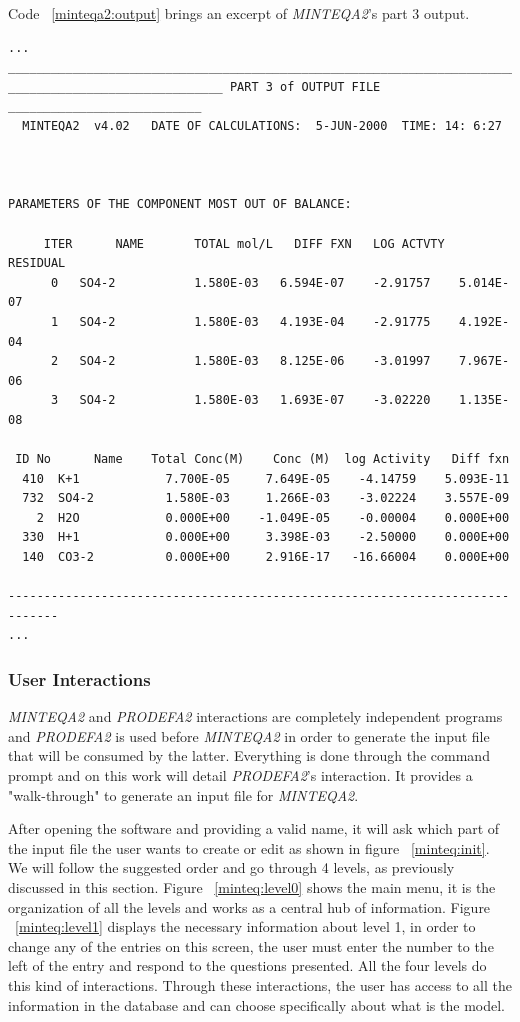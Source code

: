 \documentclass[ppgc,mestrado,english]{iiufrgs}
\begin{document}
Code ~\ref{minteqa2:output} brings an excerpt of \emph{MINTEQA2}'s part 3 output.

\begin{minipage}[c]{0.95\textwidth}
\begin{lstlisting}[frame=single, caption=\emph{MINTEQA2}'s excerpt from the output file, label=minteqa2:output]
...
________________________________________________________________________________
______________________________ PART 3 of OUTPUT FILE ___________________________
  MINTEQA2  v4.02   DATE OF CALCULATIONS:  5-JUN-2000  TIME: 14: 6:27



PARAMETERS OF THE COMPONENT MOST OUT OF BALANCE:

     ITER      NAME       TOTAL mol/L   DIFF FXN   LOG ACTVTY    RESIDUAL
      0   SO4-2           1.580E-03   6.594E-07    -2.91757    5.014E-07
      1   SO4-2           1.580E-03   4.193E-04    -2.91775    4.192E-04
      2   SO4-2           1.580E-03   8.125E-06    -3.01997    7.967E-06
      3   SO4-2           1.580E-03   1.693E-07    -3.02220    1.135E-08

 ID No      Name    Total Conc(M)    Conc (M)  log Activity   Diff fxn
  410  K+1            7.700E-05     7.649E-05    -4.14759    5.093E-11
  732  SO4-2          1.580E-03     1.266E-03    -3.02224    3.557E-09
    2  H2O            0.000E+00    -1.049E-05    -0.00004    0.000E+00
  330  H+1            0.000E+00     3.398E-03    -2.50000    0.000E+00
  140  CO3-2          0.000E+00     2.916E-17   -16.66004    0.000E+00

-----------------------------------------------------------------------------
...
\end{lstlisting}
\end{minipage}

\subsubsection{User Interactions}\label{minteq:interactions}
\emph{MINTEQA2} and \emph{PRODEFA2} interactions are completely independent programs and \emph{PRODEFA2} is used before \emph{MINTEQA2} in order to generate the input file that will be consumed by the latter. Everything is done through the command prompt and on this work will detail \emph{PRODEFA2}'s interaction. It provides a "walk-through" to generate an input file for \emph{MINTEQA2}.

After opening the software and providing a valid name, it will ask which part of the input file the user wants to create or edit as shown in figure ~\ref{minteq:init}. We will follow the suggested order and go through 4 levels, as previously discussed in this section. Figure ~\ref{minteq:level0} shows the main menu, it is the organization of all the levels and works as a central hub of information. Figure ~\ref{minteq:level1} displays the necessary information about level 1,     in order to change any of the entries on this screen, the user must enter the number to the left of the entry and respond to the questions presented. All the four levels do this kind of interactions. Through these interactions, the user has access to all the information in the database and can choose specifically about what is the model.
\end{document}
